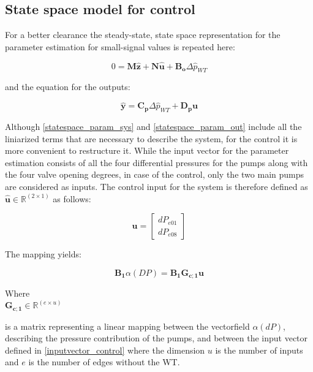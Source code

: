 \subsection{State space model for control}
 \label{SystemLin_control}
 
 For a better clearance the steady-state, state space representation for the parameter estimation for small-signal values is repeated here:
 
 \begin{equation}
 0 = \pmb{M} \pmb{\hat{z}} + \pmb{N} \pmb{\hat{u}} + \pmb{B_o} \Delta \hat{p}_{WT}    
 \label{statespace_param_sys}
\end{equation}

and the equation for the outputs:

\begin{equation}
  \pmb{\hat{y}} = \pmb{C_p} \Delta \hat{p}_{WT} + \pmb{D_p} \pmb{u} 
   \label{statespace_param_out}
\end{equation}

Although \eqref{statespace_param_sys} and \eqref{statespace_param_out} include all the liniarized terms that are necessary to describe the system, for the control it is more convenient to restructure it. While the input vector for the parameter estimation consists of all the four differential pressures for the pumps along with the four valve opening degrees, in case of the control, only the two main pumps are considered as inputs. The control input for the system is therefore defined as $\pmb{\hat{u}} \in \pmb{\mathbb{R}}^{(2 \times 1)}$ as follows: 

\begin{equation}
\pmb{u} =
\begin{bmatrix} 
dP_{e01} \\
dP_{e08} 
\label{inputvector_control}
\end{bmatrix} 
\end{equation}

The mapping yields:

\begin{equation}
\pmb{B_1} \alpha(DP) = \pmb{B_1} \pmb{G_{c;1}} \pmb{u}
\label{mapping_main}
\end{equation}


\begin{minipage}[t]{0.20\textwidth}
Where\\
\hspace*{8mm} $\pmb{G_{c;1}} \in \pmb{\mathbb{R}}^{(e \times u)} $ 
\end{minipage}
\begin{minipage}[t]{0.68\textwidth}
\vspace*{2mm}
is a matrix representing a linear mapping between the vectorfield $\alpha(dP)$, describing the pressure contribution of the pumps, and between the input vector defined in \eqref{inputvector_control} where the dimension $u$ is the number of inputs and $e$ is the number of edges without the WT. 
\end{minipage} 

